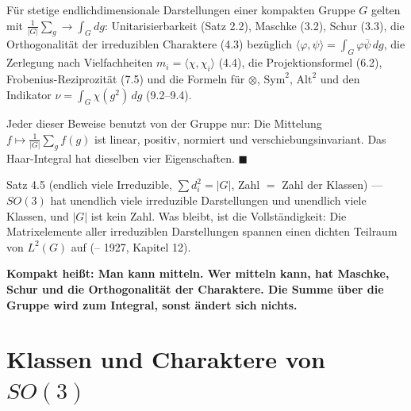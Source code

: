 \begin{merksatz}
Für stetige endlichdimensionale Darstellungen einer kompakten Gruppe $G$ gelten mit $\frac1{|G|}\sum_g\to\int_G dg$: Unitarisierbarkeit (Satz 2.2), Maschke (3.2), Schur (3.3), die Orthogonalität der irreduziblen Charaktere (4.3) bezüglich $\langle\varphi, \psi\rangle = \int_G\varphi\overline\psi\,dg$, die Zerlegung nach Vielfachheiten $m_i = \langle\chi, \chi_i\rangle$ (4.4), die Projektionsformel (6.2), Frobenius-Reziprozität (7.5) und die Formeln für $\otimes$, $\mathrm{Sym}^{2}$, $\mathrm{Alt}^{2}$ und den Indikator $\nu = \int_G\chi(g^{2})\,dg$ (9.2--9.4).

Jeder dieser Beweise benutzt von der Gruppe nur: Die Mittelung $f\mapsto\frac1{|G|}\sum_gf(g)$ ist linear, positiv, normiert und verschiebungsinvariant. Das Haar-Integral hat dieselben vier Eigenschaften. $\blacksquare$

Satz 4.5 (endlich viele Irreduzible, $\sum d_i^{2} = |G|$, Zahl $=$ Zahl der Klassen) --- $SO(3)$ hat unendlich viele irreduzible Darstellungen und unendlich viele Klassen, und $|G|$ ist kein Zahl. Was bleibt, ist die Vollständigkeit: Die Matrixelemente aller irreduziblen Darstellungen spannen einen dichten Teilraum von $L^{2}(G)$ auf (-- 1927, Kapitel 12).

\begin{center}
\begin{minipage}{0.9\textwidth}
\textbf{Kompakt heißt: Man kann mitteln. Wer mitteln kann, hat Maschke, Schur und die Orthogonalität der Charaktere. Die Summe über die Gruppe wird zum Integral, sonst ändert sich nichts.}
\end{minipage}
\end{center}
\end{merksatz}

\section{Klassen und Charaktere von $SO(3)$}

